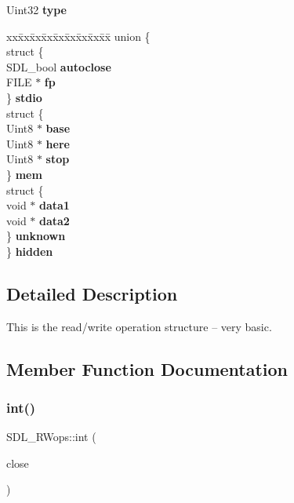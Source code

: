 \begin{DoxyCompactItemize}
Uint32 {\bfseries type}
\item 
\mbox{\label{structSDL__RWops_ae8d1f964b7593a4e6a981399e681db56}} 
\begin{tabbing}
xx\=xx\=xx\=xx\=xx\=xx\=xx\=xx\=xx\=\kill
union \{\\
\>struct \{\\
\>\>SDL\_bool {\bfseries autoclose}\\
\>\>FILE $\ast$ {\bfseries fp}\\
\>\} {\bfseries stdio}\\
\>struct \{\\
\>\>Uint8 $\ast$ {\bfseries base}\\
\>\>Uint8 $\ast$ {\bfseries here}\\
\>\>Uint8 $\ast$ {\bfseries stop}\\
\>\} {\bfseries mem}\\
\>struct \{\\
\>\>void $\ast$ {\bfseries data1}\\
\>\>void $\ast$ {\bfseries data2}\\
\>\} {\bfseries unknown}\\
\} {\bfseries hidden}\\

\end{tabbing}\end{DoxyCompactItemize}


\subsection{Detailed Description}
This is the read/write operation structure -- very basic. 

\subsection{Member Function Documentation}
\mbox{\label{structSDL__RWops_ab303bcbb0f6742a141ba8b2998923f47}} 
\subsubsection{\texorpdfstring{int()}{int()}}
{\footnotesize\ttfamily S\+D\+L\+\_\+\+R\+Wops\+::int (\begin{DoxyParamCaption}\item[{S\+D\+L\+C\+A\+LL $\ast$}]{close }\end{DoxyParamCaption})}

